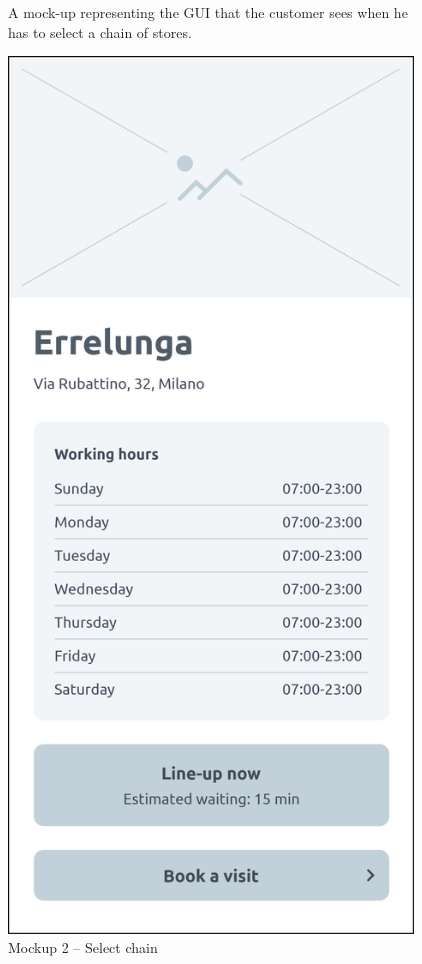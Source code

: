\documentclass[a4paper,oneside,11pt]{book}   %
\newcommand{\captionrasd}[2]{\caption{#1}\par\begin{center}\vspace{-.01\textheight}\small#2.\end{center}}
\begin{document}
\begin{figure}[H]
\begin{minipage}[b]{0.4\textwidth}
            \captionrasd{Mockup 2 -- Select chain}{A mock-up representing the GUI that the customer sees when he has to select a chain of stores}
        \end{minipage}
        \hspace{0.075\textwidth}
        \begin{minipage}[b]{0.42\textwidth}
            \vspace{-0.241\textheight}
            \includegraphics[width=0.958\textwidth]{pictures/mockups/store_view}

\end{minipage}
\end{figure}
\end{document}
